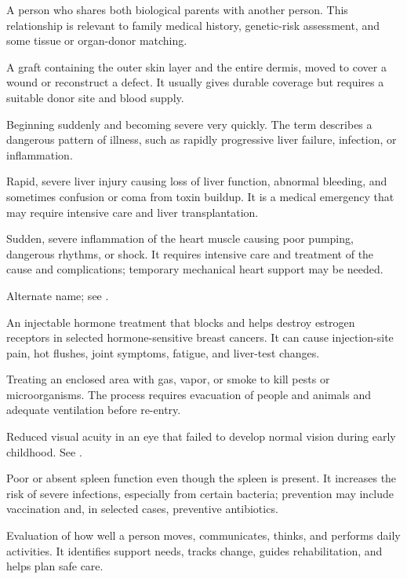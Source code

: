  A person who shares both biological parents with another person. This relationship is relevant to family medical history, genetic-risk assessment, and some tissue or organ-donor matching.

 A graft containing the outer skin layer and the entire dermis, moved to cover a wound or reconstruct a defect. It usually gives durable coverage but requires a suitable donor site and blood supply.

 Beginning suddenly and becoming severe very quickly. The term describes a dangerous pattern of illness, such as rapidly progressive liver failure, infection, or inflammation.

 Rapid, severe liver injury causing loss of liver function, abnormal bleeding, and sometimes confusion or coma from toxin buildup. It is a medical emergency that may require intensive care and liver transplantation.

 Sudden, severe inflammation of the heart muscle causing poor pumping, dangerous rhythms, or shock. It requires intensive care and treatment of the cause and complications; temporary mechanical heart support may be needed.

 Alternate name; see .

 An injectable hormone treatment that blocks and helps destroy estrogen receptors in selected hormone-sensitive breast cancers. It can cause injection-site pain, hot flushes, joint symptoms, fatigue, and liver-test changes.

 Treating an enclosed area with gas, vapor, or smoke to kill pests or microorganisms. The process requires evacuation of people and animals and adequate ventilation before re-entry.

 Reduced visual acuity in an eye that failed to develop normal vision during early childhood. See .

 Poor or absent spleen function even though the spleen is present. It increases the risk of severe infections, especially from certain bacteria; prevention may include vaccination and, in selected cases, preventive antibiotics.

 Evaluation of how well a person moves, communicates, thinks, and performs daily activities. It identifies support needs, tracks change, guides rehabilitation, and helps plan safe care.

